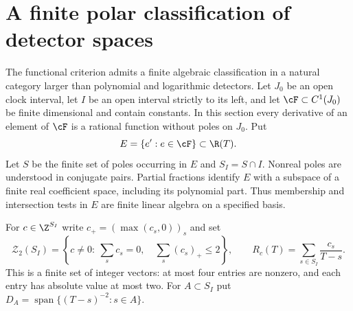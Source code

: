 \section{A finite polar classification of detector spaces}
\label{sec:v85-polar}
The functional criterion admits a finite algebraic classification in a
natural category larger than polynomial and logarithmic detectors. Let
$J_0$ be an open clock interval, let $I$ be an open interval strictly to
its left, and let $\cF\subset C^1(J_0)$ be finite dimensional and contain
constants. In this section every derivative of an element of $\cF$ is
a rational function without poles on $J_0$. Put
\[
 E=\{e':e\in\cF\}\subset\R(T).
\]
Let $S$ be the finite set of poles occurring in $E$ and $S_I=S\cap I$.
Nonreal poles are understood in conjugate pairs. Partial fractions
identify $E$ with a subspace of a finite real coefficient space,
including its polynomial part. Thus membership and intersection tests
in $E$ are finite linear algebra on a specified basis.

For $c\in\Z^{S_I}$ write $c_+=(\max(c_s,0))_s$ and set
\begin{equation}\label{eq:v85-charge-set}
 \mathcal Z_2(S_I)=\left\{c\ne0:\ \sum_s c_s=0,\quad
                   \sum_s(c_s)_+\le2\right\},\qquad
 R_c(T)=\sum_{s\in S_I}\frac{c_s}{T-s}.
\end{equation}
This is a finite set of integer vectors: at most four entries are
nonzero, and each entry has absolute value at most two. For
$A\subset S_I$ put $D_A=\operatorname{span}\{(T-s)^{-2}:s\in A\}$.

